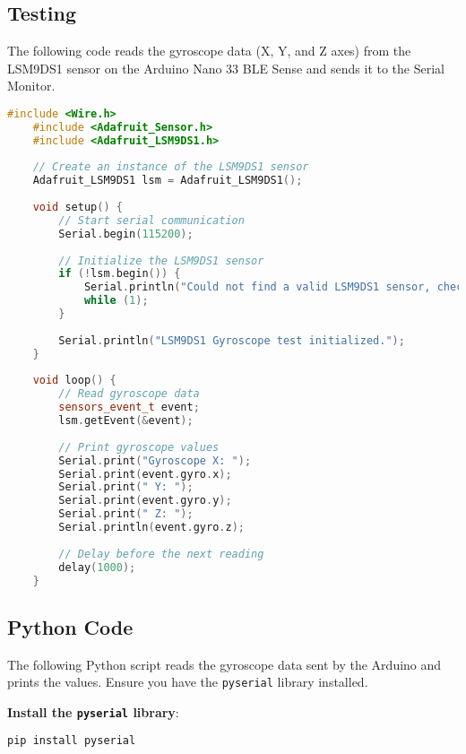 \subsection{Testing}

The following code reads the gyroscope data (X, Y, and Z axes) from the LSM9DS1 sensor on the Arduino Nano 33 BLE Sense and sends it to the Serial Monitor.

\begin{lstlisting}[style=pythonstyle ,language=C++, caption={Arduino Code to Test the Gyroscope}, label={lst:arduino_gyroscope}]
	#include <Wire.h>
	#include <Adafruit_Sensor.h>
	#include <Adafruit_LSM9DS1.h>
	
	// Create an instance of the LSM9DS1 sensor
	Adafruit_LSM9DS1 lsm = Adafruit_LSM9DS1();
	
	void setup() {
		// Start serial communication
		Serial.begin(115200);
		
		// Initialize the LSM9DS1 sensor
		if (!lsm.begin()) {
			Serial.println("Could not find a valid LSM9DS1 sensor, check wiring!");
			while (1);
		}
		
		Serial.println("LSM9DS1 Gyroscope test initialized.");
	}
	
	void loop() {
		// Read gyroscope data
		sensors_event_t event;
		lsm.getEvent(&event);
		
		// Print gyroscope values
		Serial.print("Gyroscope X: ");
		Serial.print(event.gyro.x);
		Serial.print(" Y: ");
		Serial.print(event.gyro.y);
		Serial.print(" Z: ");
		Serial.println(event.gyro.z);
		
		// Delay before the next reading
		delay(1000);
	}
\end{lstlisting}

\subsection{Python Code}
The following Python script reads the gyroscope data sent by the Arduino and prints the values. Ensure you have the \texttt{pyserial} library installed.

\textbf{Install the \texttt{pyserial} library}:
\begin{lstlisting}[style=bashstyle ,language=bash, caption={Installing pyserial}, label={lst:install_pyserial}]
	pip install pyserial
\end{lstlisting}

